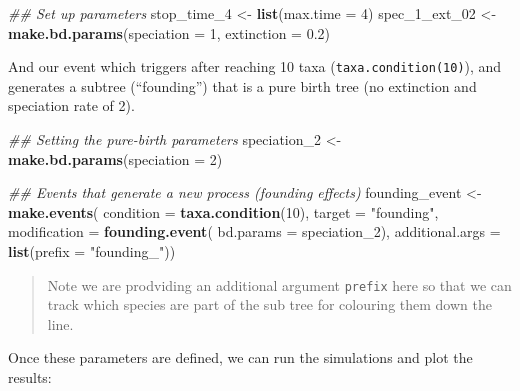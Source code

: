 \documentclass[
]{book}
\newenvironment{Shaded}{\begin{snugshade}}{\end{snugshade}}
\newcommand{\CommentTok}[1]{\textcolor[rgb]{0.56,0.35,0.01}{\textit{#1}}}
\newcommand{\DataTypeTok}[1]{\textcolor[rgb]{0.13,0.29,0.53}{#1}}
\newcommand{\DecValTok}[1]{\textcolor[rgb]{0.00,0.00,0.81}{#1}}
\newcommand{\FloatTok}[1]{\textcolor[rgb]{0.00,0.00,0.81}{#1}}
\newcommand{\KeywordTok}[1]{\textcolor[rgb]{0.13,0.29,0.53}{\textbf{#1}}}
\newcommand{\NormalTok}[1]{#1}
\newcommand{\StringTok}[1]{\textcolor[rgb]{0.31,0.60,0.02}{#1}}
\begin{document}
\begin{Shaded}
\begin{Highlighting}[]
\CommentTok{\#\# Set up parameters}
\NormalTok{stop\_time\_}\DecValTok{4}\NormalTok{ \textless{}{-}}\StringTok{ }\KeywordTok{list}\NormalTok{(}\DataTypeTok{max.time =} \DecValTok{4}\NormalTok{)}
\NormalTok{spec\_}\DecValTok{1}\NormalTok{\_ext\_}\DecValTok{02}\NormalTok{ \textless{}{-}}\StringTok{ }\KeywordTok{make.bd.params}\NormalTok{(}\DataTypeTok{speciation =} \DecValTok{1}\NormalTok{, }\DataTypeTok{extinction =} \FloatTok{0.2}\NormalTok{)}
\end{Highlighting}
\end{Shaded}

And our event which triggers after reaching 10 taxa (\texttt{taxa.condition(10)}), and generates a subtree (``founding'') that is a pure birth tree (no extinction and speciation rate of 2).

\begin{Shaded}
\begin{Highlighting}[]
\CommentTok{\#\# Setting the pure{-}birth parameters}
\NormalTok{speciation\_}\DecValTok{2}\NormalTok{ \textless{}{-}}\StringTok{ }\KeywordTok{make.bd.params}\NormalTok{(}\DataTypeTok{speciation =} \DecValTok{2}\NormalTok{)}

\CommentTok{\#\# Events that generate a new process (founding effects)}
\NormalTok{founding\_event \textless{}{-}}\StringTok{ }\KeywordTok{make.events}\NormalTok{(}
                  \DataTypeTok{condition =} \KeywordTok{taxa.condition}\NormalTok{(}\DecValTok{10}\NormalTok{),}
                  \DataTypeTok{target  =} \StringTok{"founding"}\NormalTok{,}
                  \DataTypeTok{modification =} \KeywordTok{founding.event}\NormalTok{(}
                                    \DataTypeTok{bd.params =}\NormalTok{ speciation\_}\DecValTok{2}\NormalTok{),}
                  \DataTypeTok{additional.args =} \KeywordTok{list}\NormalTok{(}\DataTypeTok{prefix =} \StringTok{"founding\_"}\NormalTok{))}
\end{Highlighting}
\end{Shaded}

\begin{quote}
Note we are prodviding an additional argument \texttt{prefix} here so that we can track which species are part of the sub tree for colouring them down the line.
\end{quote}

Once these parameters are defined, we can run the simulations and plot the results:
\end{document}
